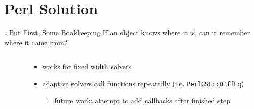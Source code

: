 \documentclass[mathserif]{beamer}
\providecommand{\code}[1]{{\texttt{\scriptsize{#1}}}}
\begin{document}
\section{Perl Solution}

\begin{frame}[fragile]{\ldots But First, Some Bookkeeping}
  If an object knows where it is, can it remember where it came from?
  \begin{columns}
    \begin{column}{0.49\linewidth}
      \begin{block}{}
        \scriptsize
        
      \end{block}
    \end{column}
    \begin{column}{0.49\linewidth}
      \begin{itemize}
        \item works for fixed width solvers
        \item adaptive solvers call functions repeatedly (i.e. \code{PerlGSL::DiffEq})
          \begin{itemize}
            \item future work: attempt to add callbacks after finished step
          \end{itemize}
      \end{itemize}
    \end{column}
  \end{columns}
\end{frame}
\end{document}
